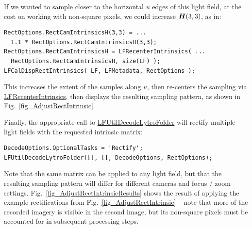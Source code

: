 \documentclass[onecolumn]{article}
\newcommand{\CiteFunction}[1]{\hyperlink{#1}{\small #1}}
\begin{document}
If we wanted to sample closer to the horizontal $u$ edges of this light field, at the cost on working with non-square pixels, we could increase $\mat{H}(3,3)$, as in:
\begin{Verbatim}
RectOptions.RectCamIntrinsicsH(3,3) = ...
  1.1 * RectOptions.RectCamIntrinsicsH(3,3);
RectOptions.RectCamIntrinsicsH = LFRecenterIntrinsics( ...
  RectOptions.RectCamIntrinsicsH, size(LF) );
LFCalDispRectIntrinsics( LF, LFMetadata, RectOptions );
\end{Verbatim}
This increases the extent of the samples along $u$, then re-centers the sampling via \CiteFunction{LFRecenterIntrinsics}, then displays the resulting sampling pattern, as shown in Fig.~\ref{fig_AdjustRectIntrinsic}.

Finally, the appropriate call to \CiteFunction{LFUtilDecodeLytroFolder} will rectify multiple light fields with the requested intrinsic matrix:
\begin{Verbatim}
DecodeOptions.OptionalTasks = 'Rectify';
LFUtilDecodeLytroFolder([], [], DecodeOptions, RectOptions);
\end{Verbatim}
Note that the same matrix can be applied to any light field, but that the resulting sampling pattern will differ for different cameras and focus / zoom settings.  Fig.~\ref{fig_AdjustRectIntrinsicResults} shows the result of applying the example rectifications from Fig.~\ref{fig_AdjustRectIntrinsic} -- note that more of the recorded imagery is visible in the second image, but its non-square pixels must be accounted for in subsequent processing steps.
\end{document}
